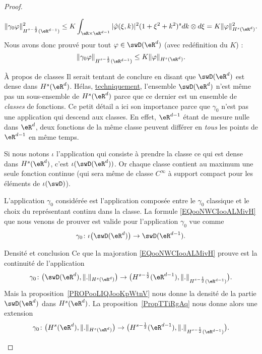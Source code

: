 \begin{proof}
\begin{subproof}
		\begin{equation}
			\| \gamma_0\varphi \|^2_{H^{s-\frac{ 1 }{2}}(\eR^{d-1})}\leq K\int_{\eR\times \eR^{d-1}} |\hat \varphi(\xi,k) |^2(1+\xi^2+k^2)^sdk\otimes d\xi=K\| \varphi \|^2_{H^s(\eR^d)}.
		\end{equation}
		Nous avons donc prouvé pour tout \( \varphi\in\swD(\eR^d)\) (avec redéfinition du \( K\)) :
		\begin{equation}        \label{EQooNWCIooALMivH}
			\| \gamma_0\varphi \|_{H^{s-\frac{ 1 }{2}}(\eR^{d-1})}\leq K\| \varphi \|_{H^s(\eR^d)}.
		\end{equation}
		\item[À propos de classes]
		Il serait tentant de conclure en disant que \( \swD(\eR^d)\) est dense dans \( H^s(\eR^d)\). Hélas, \href{https://explosm.net/comics/3613/}{techniquement}, l'ensemble \( \swD(\eR^d)\) n'est même pas un sous-ensemble de \( H^s(\eR^d)\) parce que ce dernier est un ensemble de \emph{classes} de fonctions. Ce petit détail a ici son importance parce que \( \gamma_0\) n'est pas une application qui descend aux classes. En effet, \( \eR^{d-1}\) étant de mesure nulle dans \( \eR^d\), deux fonctions de la même classe peuvent différer en \emph{tous} les points de \( \eR^{d-1}\) en même temps.

		Si nous notons \( \iota\) l'application qui consiste à prendre la classe ce qui est dense dans \( H^s(\eR^d)\), c'est \( \iota(\swD(\eR^d))\). Or chaque classe contient au maximum une seule fonction continue (qui sera même de classe \(  C^{\infty}\) à support compact pour les éléments de \( \iota(\swD)\)).

		L'application \( \gamma_0\) considérée est l'application composée entre le \( \gamma_0\) classique et le choix du représentant continu dans la classe. La formule \eqref{EQooNWCIooALMivH} que nous venons de prouver est valide pour l'application \( \gamma_0\) vue comme
		\begin{equation}
			\gamma_0\colon \iota\big( \swD(\eR^d) \big)\to \swD(\eR^{d-1}).
		\end{equation}
		\item[Densité et conclusion]
		Ce que la majoration \eqref{EQooNWCIooALMivH} prouve est la continuité de l'application
		\begin{equation}
			\gamma_0\colon \big( \swD(\eR^d),\| . \|_{H^s(\eR^d)} \big)\to \big( H^{s-\frac{ 1 }{2}}(\eR^{d-1}),\| . \|_{H^{s-\frac{ 1 }{2}}(\eR^{d-1})} \big).
		\end{equation}
		Mais la proposition~\ref{PROPooLIQJooKpWtnV} nous donne la densité de la partie \( \swD(\eR^d)\) dans \( H^s(\eR^d)\). La proposition~\ref{PropTTiRgAq} nous donne alors une extension
		\begin{equation}
			\gamma_0\colon \big(   H^s(\eR^d), \| . \|_{H^s(\eR^d)}   \big)\to \big( H^{s-\frac{ 1 }{2}}(\eR^{d-1}),\| . \|_{H^{s-\frac{ 1 }{2}}(\eR^{d-1})} \big).
		\end{equation}
	\end{subproof}
\end{proof}

